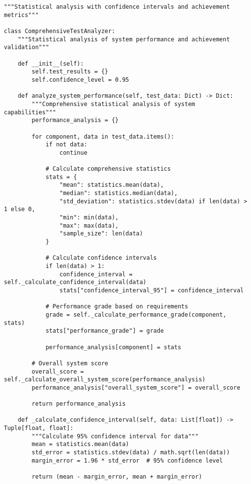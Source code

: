 \documentclass[12pt,a4paper]{article}
\begin{document}
{{\begin{verbatim}
"""Statistical analysis with confidence intervals and achievement metrics"""

class ComprehensiveTestAnalyzer:
    """Statistical analysis of system performance and achievement validation"""
    
    def __init__(self):
        self.test_results = {}
        self.confidence_level = 0.95
        
    def analyze_system_performance(self, test_data: Dict) -> Dict:
        """Comprehensive statistical analysis of system capabilities"""
        performance_analysis = {}
        
        for component, data in test_data.items():
            if not data:
                continue
                
            # Calculate comprehensive statistics
            stats = {
                "mean": statistics.mean(data),
                "median": statistics.median(data),
                "std_deviation": statistics.stdev(data) if len(data) > 1 else 0,
                "min": min(data),
                "max": max(data),
                "sample_size": len(data)
            }
            
            # Calculate confidence intervals
            if len(data) > 1:
                confidence_interval = self._calculate_confidence_interval(data)
                stats["confidence_interval_95"] = confidence_interval
            
            # Performance grade based on requirements
            grade = self._calculate_performance_grade(component, stats)
            stats["performance_grade"] = grade
            
            performance_analysis[component] = stats
        
        # Overall system score
        overall_score = self._calculate_overall_system_score(performance_analysis)
        performance_analysis["overall_system_score"] = overall_score
        
        return performance_analysis
    
    def _calculate_confidence_interval(self, data: List[float]) -> Tuple[float, float]:
        """Calculate 95% confidence interval for data"""
        mean = statistics.mean(data)
        std_error = statistics.stdev(data) / math.sqrt(len(data))
        margin_error = 1.96 * std_error  # 95% confidence level
        
        return (mean - margin_error, mean + margin_error)
\end{verbatim}

}}
\end{document}
